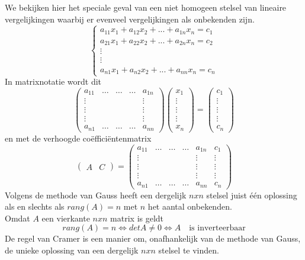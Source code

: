 We bekijken hier het speciale geval van een niet homogeen stelsel van lineaire vergelijkingen waarbij er evenveel vergelijkingen als onbekenden zijn. 
\[ 
\left\{ \begin{array}{l}
a_{11} x_1 + a_{12} x_2 + ... + a_{1n} x_n = c_1 \\
a_{21} x_1 + a_{22} x_2 + ... + a_{2n} x_n = c_2 \\
\vdots \\ \vdots \\
a_{n1} x_1 + a_{n2} x_2 + ... + a_{nn} x_n = c_n
\end{array}
\right.
\]
In matrixnotatie wordt dit
\[ 
\left( \begin{matrix} a_{11} & \ldots & \ldots & \ldots & a_{1n} \\ \vdots & & & & \vdots \\ \vdots & & & & \vdots \\ \vdots & & & & \vdots \\ a_{n1} & \ldots & \ldots & \ldots & a_{nn} \end{matrix} \right) \left( \begin{matrix} x_1 \\ \vdots \\ \vdots \\ \vdots \\ x_n \end{matrix} \right) = \left( \begin{matrix} c_1 \\ \vdots \\ \vdots \\ \vdots \\ c_n \end{matrix} \right)
\]
en met de verhoogde co\"{e}ffici\"{e}ntenmatrix
\[
\left( \begin{array}{c|c} A & C \end{array} \right) =
\left( 
\begin{array}{ccccc|c}
a_{11} & \ldots & \ldots & \ldots & a_{1n} & c_1 \\ \vdots & & & & \vdots & \vdots \\ \vdots & & & & \vdots & \vdots \\ \vdots & & & & \vdots & \vdots \\ a_{n1} & \ldots & \ldots & \ldots & a_{nn} & c_n
\end{array} 
\right)
\]
Volgens de methode van Gauss heeft een dergelijk $nxn$ stelsel juist \'{e}\'{e}n oplossing als en slechts als $rang(A)=n$ met $n$ het aantal onbekenden.\\
Omdat $A$ een vierkante $nxn$ matrix is geldt
\[ rang(A)=n \Leftrightarrow det A \neq 0 \Leftrightarrow A \quad \textrm{is inverteerbaar} \]
De regel van Cramer is een manier om, onafhankelijk van de methode van Gauss, de unieke oplossing van een dergelijk $nxn$ stelsel te vinden. \\

